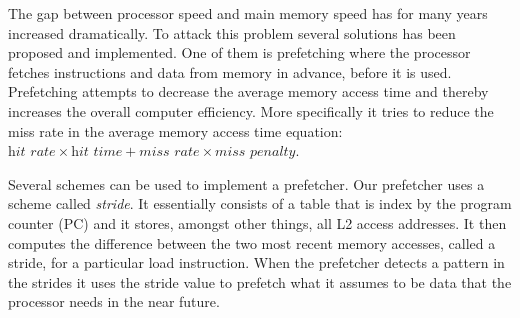 The gap between processor speed and main memory speed has for many years increased
dramatically\cite{mem_cpu_gap}. To attack this problem several solutions has been proposed and
implemented. One of them is prefetching where the processor fetches instructions and data from
memory in advance, before it is used.  Prefetching attempts to decrease the average memory access
time and thereby increases the overall computer efficiency. More specifically it tries to reduce the
miss rate in the average memory access time equation: $ \textit{hit rate} \times \textit{hit time} +
\textit{miss rate} \times \textit{miss penalty} $.

Several schemes can be used to implement a prefetcher. Our prefetcher uses a scheme called
\emph{stride}. It essentially consists of a table that is index by the program counter (PC) and it
stores, amongst other things, all L2 access addresses. It then computes the difference between the
two most recent memory accesses, called a stride, for a particular load instruction. When the
prefetcher detects a pattern in the strides it uses the stride value to prefetch what it assumes to
be data that the processor needs in the near future.



